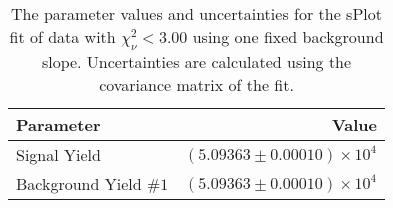 
\begin{table}[ht]
    \begin{center}
        \begin{tabular}{lr}\toprule
            Parameter & Value \\\midrule
            Signal Yield & $(5.09363 \pm 0.00010) \times 10^{4}$ \\
            Background Yield $\#1$ & $(5.09363 \pm 0.00010) \times 10^{4}$ \\\bottomrule
        \end{tabular}
        \caption{The parameter values and uncertainties for the sPlot fit of data with $\chi^2_\nu < 3.00$ using one fixed background slope. Uncertainties are calculated using the covariance matrix of the fit.}\label{tab:splot-fit-results-chisqdof-3.00-fixed-1}
    \end{center}
\end{table}

